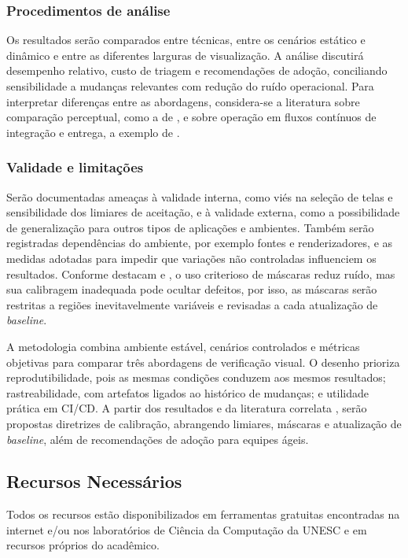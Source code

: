 \documentclass{UNESC}
\begin{document}
\subsubsection{Procedimentos de análise}
Os resultados serão comparados entre técnicas, entre os cenários estático e dinâmico e entre as diferentes larguras de visualização. A análise discutirá desempenho relativo, custo de triagem e recomendações de adoção, conciliando sensibilidade a mudanças relevantes com redução do ruído operacional. Para interpretar diferenças entre as abordagens, considera-se a literatura sobre comparação perceptual, como a de , e sobre operação em fluxos contínuos de integração e entrega, a exemplo de .

\subsubsection{Validade e limitações}
Serão documentadas ameaças à validade interna, como viés na seleção de telas e sensibilidade dos limiares de aceitação, e à validade externa, como a possibilidade de generalização para outros tipos de aplicações e ambientes. Também serão registradas dependências do ambiente, por exemplo fontes e renderizadores, e as medidas adotadas para impedir que variações não controladas influenciem os resultados. Conforme destacam  e , o uso criterioso de máscaras reduz ruído, mas sua calibragem inadequada pode ocultar defeitos, por isso, as máscaras serão restritas a regiões inevitavelmente variáveis e revisadas a cada atualização de \emph{baseline}.

A metodologia combina ambiente estável, cenários controlados e métricas objetivas para comparar três abordagens de verificação visual. O desenho prioriza reprodutibilidade, pois as mesmas condições conduzem aos mesmos resultados; rastreabilidade, com artefatos ligados ao histórico de mudanças; e utilidade prática em CI/CD. A partir dos resultados e da literatura correlata \cite{wang2004,tanno2020,shahin2017,heinonen2020}, serão propostas diretrizes de calibração, abrangendo limiares, máscaras e atualização de \emph{baseline}, além de recomendações de adoção para equipes ágeis.


\subsection{Recursos Necessários}
Todos os recursos estão disponibilizados em ferramentas gratuitas encontradas na internet e/ou nos laboratórios de Ciência da Computação da UNESC e em recursos próprios do acadêmico.
\end{document}
